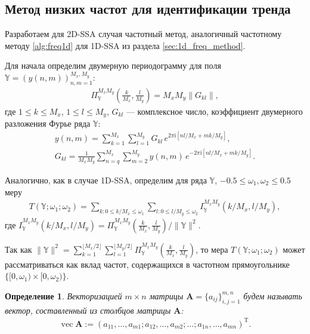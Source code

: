 \documentclass[specialist,
               substylefile = spbu.rtx,
               subf,href,colorlinks=true, 12pt]{disser}
\def\vec{\mathop{\mathrm{vec}}}
\newcommand{\I}{\mathrm{i}}
\newtheorem{defn}{Определение}
\begin{document}
\subsection{Метод низких частот для идентификации тренда}
\label{sec:freq_method_2d}

Разработаем для 2D-SSA случая частотный метод, аналогичный частотному методу \ref{alg:freq1d} для 1D-SSA из раздела \ref{sec:1d_freq_method}.

Для начала определим двумерную периодограмму для поля $\mathbb{Y}=\left(y(n,m)\right)_{n,m=1}^{M_x, M_y}$:
\begin{gather*}
 \Pi_\mathbb{Y}^{M_x M_y} \left(\frac{k}{M_x}, \frac{l}{M_y}\right) = M_x M_y \|G_{kl}\|,
\end{gather*}
где $1 \leqslant k \leqslant M_x$, $1 \leqslant l \leqslant M_y$, $G_{kl}$ --- комплексное число, коэффициент двумерного разложения Фурье ряда $\mathbb{Y}$:
\begin{gather*}
y(n,m)=\sum_{k=1}^{M_x}\sum_{l=1}^{M_y} G_{kl}\, e^{2\pi\I \left[nl/M_x + mk/M_y\right]}, \\
 G_{kl}= \frac{1}{M_x M_y} \sum_{n=q}^{M_x}\sum_{m=2}^{M_y} y(n,m)\, e^{-2\pi\I \left[nl/M_x + mk/M_y\right]}.
\end{gather*}

Аналогично, как в случае 1D-SSA, определим для ряда $\mathbb{Y}$, $-0.5 \leqslant \omega_{1},  \omega_{2} \leqslant 0.5$ меру
\begin{gather}
\label{eq:T_measure_2d}
T(\mathbb{Y}; \omega_{1}; \omega_{2}) = \sum_{k: 0 \leqslant k/M_x \leqslant \omega_{1}} \sum_{l: 0 \leqslant l/M_y \leqslant \omega_{2}}  I_\mathbb{Y}^{M_x M_y}(k/M_x, l/M_y),
\end{gather}
где $I_\mathbb{Y}^{M_x M_y}(k/M_x, l/M_y) =\Pi_\mathbb{Y}^{M_x M_y} \left(\frac{k}{M_x}, \frac{l}{M_y}\right) / \|\mathbb{Y}\|^2$.

Так как $\|\mathbb{Y}\|^2  =  \sum_{k=1}^{\lfloor M_x/2 \rfloor}  \sum_{l=1}^{\lfloor M_y/2 \rfloor}  \Pi_{\mathbb{Y}}^{M_x M_y} \left(\frac{k}{M_x}, \frac{l}{M_y}\right)$, то мера $T(\mathbb{Y}; \omega_{1}; \omega_{2}) $ может рассматриваться как вклад частот, содержащихся в частотном прямоугольнике $\{[0, \omega_{1}) \times [0, \omega_{2}) \}$.

\begin{defn}
Векторизацией $m \times n$ матрицы $\mathbf{A} = \{a_{ij}\}_{i,j=1}^{m,n}$ будем называть вектор, составленный из столбцов матрицы $\mathbf{A}$:
\begin{gather*}
\vec \mathbf{A} := (a_{11}, \ldots, a_{m1}; a_{12}, \ldots, a_{m2}; \ldots;  a_{1n}, \ldots, a_{mn})^{\mathrm{T}}.
\end{gather*}
\end{defn}
\end{document}
